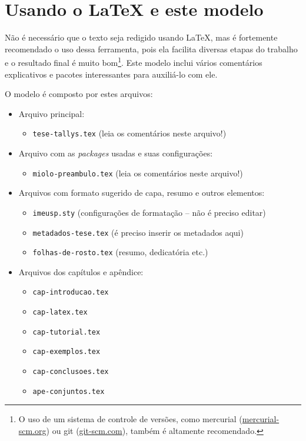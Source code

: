 \chapter{Usando o \LaTeX{} e este modelo}

Não é necessário que o texto seja redigido usando \LaTeX{}, mas é fortemente
recomendado o uso dessa ferramenta, pois ela facilita diversas etapas do
trabalho e o resultado final é muito bom\footnote{O uso de um sistema de
controle de versões, como mercurial (\url{mercurial-scm.org}) ou git
(\url{git-scm.com}), também é altamente recomendado.}. Este modelo inclui
vários comentários explicativos e pacotes interessantes para auxiliá-lo com
ele.

O modelo é composto por estes arquivos:

\begin{itemize}
  \item Arquivo principal:
  \begin{itemize}
    \item \texttt{tese-tallys.tex} (leia os comentários neste arquivo!)
  \end{itemize}

  \item Arquivo com as \textit{packages} usadas e suas configurações:
  \begin{itemize}
    \item \texttt{miolo-preambulo.tex} (leia os comentários neste arquivo!)
  \end{itemize}

  \item Arquivos com formato sugerido de capa, resumo e outros elementos:
  \begin{itemize}
    \item \texttt{imeusp.sty} (configurações de formatação -- não é preciso editar)
    \item \texttt{metadados-tese.tex} (é preciso inserir os metadados aqui)
    \item \texttt{folhas-de-rosto.tex} (resumo, dedicatória etc.)
  \end{itemize}

  \item Arquivos dos capítulos e apêndice:
  \begin{itemize}
    \item \texttt{cap-introducao.tex}
    \item \texttt{cap-latex.tex}
    \item \texttt{cap-tutorial.tex}
    \item \texttt{cap-exemplos.tex}
    \item \texttt{cap-conclusoes.tex}
    \item \texttt{ape-conjuntos.tex}
  \end{itemize}


\end{itemize}
